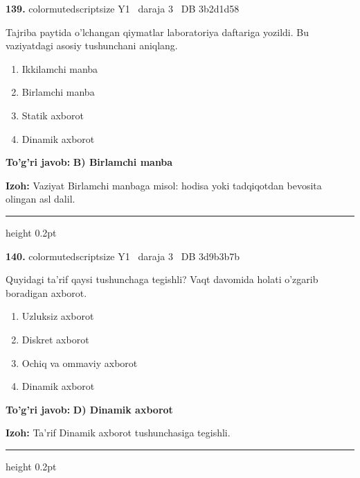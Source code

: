 \documentclass[10pt,a4paper,oneside]{article}
\begin{document}
\noindent\textbf{\color{ink}139.}  {color{muted}scriptsize Y1 \textbullet\ daraja 3 \textbullet\ DB 3b2d1d58}
\par
Tajriba paytida o'lchangan qiymatlar laboratoriya daftariga yozildi. Bu vaziyatdagi asosiy tushunchani aniqlang.
\begin{enumerate}[label=\Alph*),leftmargin=9mm]
\item Ikkilamchi manba
\item Birlamchi manba
\item Statik axborot
\item Dinamik axborot
\end{enumerate}
\begin{tcolorbox}[enhanced,breakable,colback=teal!4,colframe=teal!50!black,boxrule=0.5pt,arc=1.1mm,left=3mm,right=3mm,top=1.7mm,bottom=1.7mm,before skip=2mm,after skip=2mm]
\textbf{\color{teal}To'g'ri javob:} \textbf{B) Birlamchi manba}
\par\smallskip
\textbf{Izoh:} Vaziyat Birlamchi manbaga misol: hodisa yoki tadqiqotdan bevosita olingan asl dalil.
\end{tcolorbox}
\vspace{2mm}\hrule height 0.2pt \vspace{3mm}

\noindent\textbf{\color{ink}140.}  {color{muted}scriptsize Y1 \textbullet\ daraja 3 \textbullet\ DB 3d9b3b7b}
\par
Quyidagi ta'rif qaysi tushunchaga tegishli? Vaqt davomida holati o'zgarib boradigan axborot.
\begin{enumerate}[label=\Alph*),leftmargin=9mm]
\item Uzluksiz axborot
\item Diskret axborot
\item Ochiq va ommaviy axborot
\item Dinamik axborot
\end{enumerate}
\begin{tcolorbox}[enhanced,breakable,colback=teal!4,colframe=teal!50!black,boxrule=0.5pt,arc=1.1mm,left=3mm,right=3mm,top=1.7mm,bottom=1.7mm,before skip=2mm,after skip=2mm]
\textbf{\color{teal}To'g'ri javob:} \textbf{D) Dinamik axborot}
\par\smallskip
\textbf{Izoh:} Ta'rif Dinamik axborot tushunchasiga tegishli.
\end{tcolorbox}
\vspace{2mm}\hrule height 0.2pt \vspace{3mm}
\end{document}

